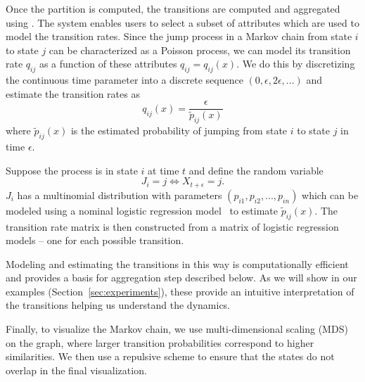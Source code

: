 

Once the partition is computed, the transitions are computed and aggregated using .
%
The system enables users to select a subset of attributes which are used to model the transition rates. Since the
jump process in a Markov chain from state $i$ to state $j$ can be characterized as a Poisson process, we can model its
transition rate $q_{ij}$ as a function of these attributes $q_{ij} = q_{ij}(x)$. We do this by discretizing the continuous time parameter into a discrete sequence $(0, \epsilon, 2\epsilon, ...)$ and
estimate the transition rates as
\begin{equation}
	q_{ij}(x) = \frac{\epsilon}{\tilde{p}_{ij}(x)}
\end{equation}
where $\tilde{p}_{ij}(x)$ is the estimated probability of jumping from state $i$ to state $j$ in time
$\epsilon$.

Suppose the process is in state $i$ at time $t$ and define the random variable 
$$J_i = j \Leftrightarrow X_{t + \epsilon} = j.$$
$J_i$  has a multinomial distribution with parameters $(p_{i1}, p_{i2}, ..., p_{in})$ which can be 
modeled using a nominal logistic regression model~\cite{glm-introduction} to estimate $\tilde{p}_{ij}(x)$.
The transition rate matrix is then constructed from a matrix of logistic regression models -- one for each possible transition. 

Modeling and estimating the transitions in this way is computationally efficient and provides a basis for aggregation step described below. As we will show in our examples (Section~\ref{sec:experiments}), these provide an intuitive interpretation of the transitions helping us understand the dynamics. 	

Finally, to visualize the Markov chain, we use multi-dimensional scaling (MDS) \cite{} on the graph, where larger transition probabilities correspond to higher similarities. We then use a repulsive scheme to ensure that the states do not overlap in the final visualization. 

